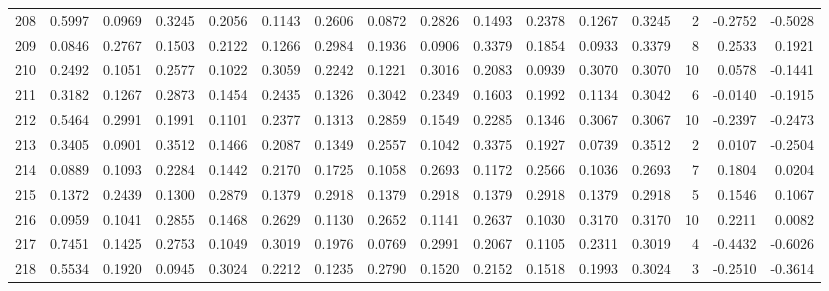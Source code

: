 \begin{tabular}{lrrrrrrrrrrrrrrr}
208 &      0.5997 &  0.0969 &  0.3245 &  0.2056 &  0.1143 &  0.2606 &  0.0872 &  0.2826 &  0.1493 &  0.2378 &   0.1267 &     0.3245 &      2 &                   -0.2752 &                    -0.5028 \\
209 &      0.0846 &  0.2767 &  0.1503 &  0.2122 &  0.1266 &  0.2984 &  0.1936 &  0.0906 &  0.3379 &  0.1854 &   0.0933 &     0.3379 &      8 &                    0.2533 &                     0.1921 \\
210 &      0.2492 &  0.1051 &  0.2577 &  0.1022 &  0.3059 &  0.2242 &  0.1221 &  0.3016 &  0.2083 &  0.0939 &   0.3070 &     0.3070 &     10 &                    0.0578 &                    -0.1441 \\
211 &      0.3182 &  0.1267 &  0.2873 &  0.1454 &  0.2435 &  0.1326 &  0.3042 &  0.2349 &  0.1603 &  0.1992 &   0.1134 &     0.3042 &      6 &                   -0.0140 &                    -0.1915 \\
212 &      0.5464 &  0.2991 &  0.1991 &  0.1101 &  0.2377 &  0.1313 &  0.2859 &  0.1549 &  0.2285 &  0.1346 &   0.3067 &     0.3067 &     10 &                   -0.2397 &                    -0.2473 \\
213 &      0.3405 &  0.0901 &  0.3512 &  0.1466 &  0.2087 &  0.1349 &  0.2557 &  0.1042 &  0.3375 &  0.1927 &   0.0739 &     0.3512 &      2 &                    0.0107 &                    -0.2504 \\
214 &      0.0889 &  0.1093 &  0.2284 &  0.1442 &  0.2170 &  0.1725 &  0.1058 &  0.2693 &  0.1172 &  0.2566 &   0.1036 &     0.2693 &      7 &                    0.1804 &                     0.0204 \\
215 &      0.1372 &  0.2439 &  0.1300 &  0.2879 &  0.1379 &  0.2918 &  0.1379 &  0.2918 &  0.1379 &  0.2918 &   0.1379 &     0.2918 &      5 &                    0.1546 &                     0.1067 \\
216 &      0.0959 &  0.1041 &  0.2855 &  0.1468 &  0.2629 &  0.1130 &  0.2652 &  0.1141 &  0.2637 &  0.1030 &   0.3170 &     0.3170 &     10 &                    0.2211 &                     0.0082 \\
217 &      0.7451 &  0.1425 &  0.2753 &  0.1049 &  0.3019 &  0.1976 &  0.0769 &  0.2991 &  0.2067 &  0.1105 &   0.2311 &     0.3019 &      4 &                   -0.4432 &                    -0.6026 \\
218 &      0.5534 &  0.1920 &  0.0945 &  0.3024 &  0.2212 &  0.1235 &  0.2790 &  0.1520 &  0.2152 &  0.1518 &   0.1993 &     0.3024 &      3 &                   -0.2510 &                    -0.3614 \\

\end{tabular}
